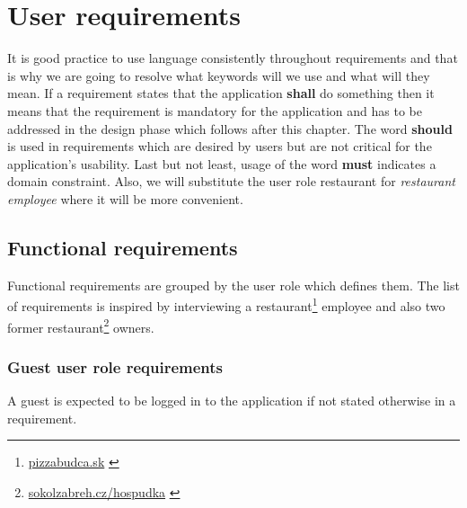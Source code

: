 \section{User requirements}
It is good practice to use language consistently throughout requirements and that is why we are going to resolve what keywords will we use and what will they mean.
If a requirement states that the application \textbf{shall} do something then it means that the requirement is mandatory for the application and has to be addressed in the design phase which follows after this chapter. 
The word \textbf{should} is used in requirements which are desired by users but are not critical for the application's usability.
Last but not least, usage of the word \textbf{must} indicates a domain constraint.
Also, we will substitute the user role restaurant for \emph{restaurant employee} where it will be more convenient.

\subsection{Functional requirements}
Functional requirements are grouped by the user role which defines them.
The list of requirements is inspired by interviewing a restaurant\footnote{\url{pizzabudca.sk}  \label{fnlabel}} employee and also two former restaurant\footnote{\url{sokolzabreh.cz/hospudka}  \label{fnlabel}} owners.

\subsubsection{Guest user role requirements}
A guest is expected to be logged in to the application if not stated otherwise in a requirement.

